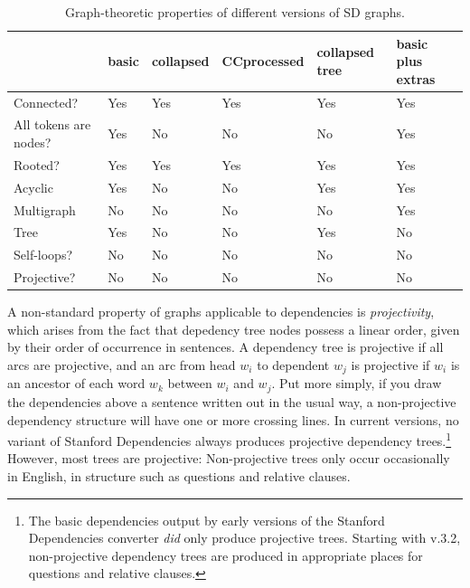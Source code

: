 \documentclass[11pt,letterpaper]{article}
\begin{document}
\begin{table}
\begin{tabular}{llllll}
\hline
 & basic & collapsed & CCprocessed & collapsed tree & basic plus extras\\ \hline
Connected? & Yes & Yes & Yes & Yes & Yes \\
All tokens are nodes? & Yes & No & No & No & Yes \\
Rooted? & Yes & Yes & Yes & Yes & Yes \\
Acyclic & Yes & No & No & Yes & Yes \\
Multigraph & No & No & No & No & Yes \\
Tree & Yes & No & No & Yes & No \\
Self-loops? & No & No & No & No & No \\ 
Projective? & No & No & No & No & No \\ \hline
\end{tabular}
\caption{Graph-theoretic properties of different versions of SD graphs.}\label{graph-properties}
\end{table}

A non-standard property of graphs applicable to dependencies is
\emph{projectivity}, which arises from the fact that depedency tree
nodes possess a linear order, given by their order of occurrence in sentences. A
dependency tree is projective if all arcs are projective, and an arc
from head $w_i$ to dependent $w_j$ is projective if $w_i$ is an
ancestor of each word $w_k$ between $w_i$ and
$w_j$. Put more simply, if you draw the dependencies above a sentence
written out in the usual way, a non-projective dependency structure
will have one or more crossing lines. In current versions, no variant of Stanford Dependencies
always produces projective dependency trees.\footnote
 {The basic dependencies output by early versions of
   the Stanford Dependencies converter \emph{did} only produce
   projective trees. Starting with v.3.2, non-projective dependency
   trees are produced in appropriate places for questions and relative clauses.}
However, most trees are projective: Non-projective trees only occur
occasionally in English, in structure such as questions and relative clauses.
\end{document}
